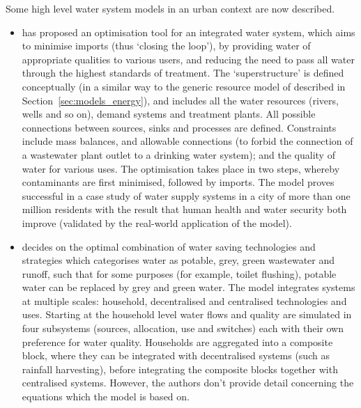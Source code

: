 Some high level water system models in an urban context are now described. 
\begin{itemize}
	\item \citet{Lim2010} has proposed an optimisation tool for an integrated water system, which aims to minimise imports (thus `closing the loop'), by providing water of appropriate qualities to various users, and reducing the need to pass all water through the highest standards of treatment. The `superstructure' is defined conceptually (in a similar way to the generic resource model of \citet{Samsatli} described in Section~\ref{sec:models_energy}), and includes all the water resources (rivers, wells and so on), demand systems and treatment plants. All possible connections between sources, sinks and processes are defined. Constraints include mass balances, and allowable connections (to forbid the connection of a wastewater plant outlet to a drinking water system); and the quality of water for various uses. The optimisation takes place in two steps, whereby contaminants are first minimised, followed by imports. The model proves successful in a case study of water supply systems in a city of more than one million residents with the result that human health and water security both improve (validated by the real-world application of the model).
	\item \citet{Makropoulos2008} decides on the optimal combination of water saving technologies and strategies which categorises water as potable, grey, green wastewater and runoff, such that for some purposes (for example, toilet flushing), potable water can be replaced by grey and green water. The model integrates systems at multiple scales: household, decentralised and centralised technologies and uses. Starting at the household level water flows and quality are simulated in four subsystems (sources, allocation, use and switches) each with their own preference for water quality. Households are aggregated into a composite block, where they can be integrated with decentralised systems (such as rainfall harvesting), before integrating the composite blocks together with centralised systems. However, the authors don't provide detail concerning the equations which the model is based on.
\end{itemize}

